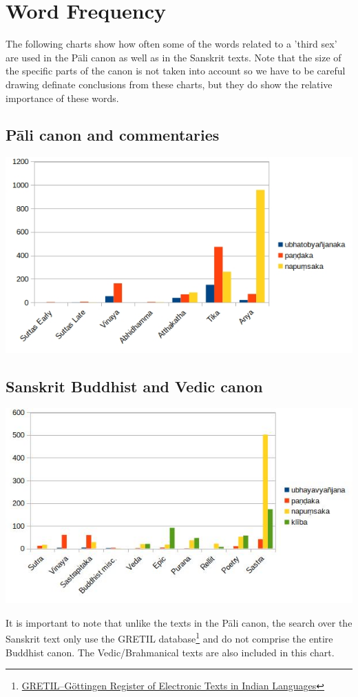 \section{Word Frequency}
\label{appendix2}

The following charts show how often some of the words related to a 'third sex' are used in the Pāli canon as well as in the Sanskrit texts. Note that the size of the specific parts of the canon is not taken into account so we have to be careful drawing definate conclusions from these charts, but they do show the relative importance of these words. 

\subsection{Pāli canon and commentaries}

\includegraphics[width=0.7\linewidth]{pali.jpg}
\label{pali1}

\subsection{Sanskrit Buddhist and Vedic canon}

\includegraphics[width=0.7\linewidth]{sanskrit.jpg}
\label{sanskrit1}

\medskip
It is important to note that unlike the texts in the Pāli canon, the search over the Sanskrit text only use the GRETIL database\footnote{\href{http://gretil.sub.uni-goettingen.de/gretil.html}{GRETIL--Göttingen Register of Electronic Texts in Indian Languages}} and do not comprise the entire Buddhist canon. The Vedic/Brahmanical texts are also included in this chart.
